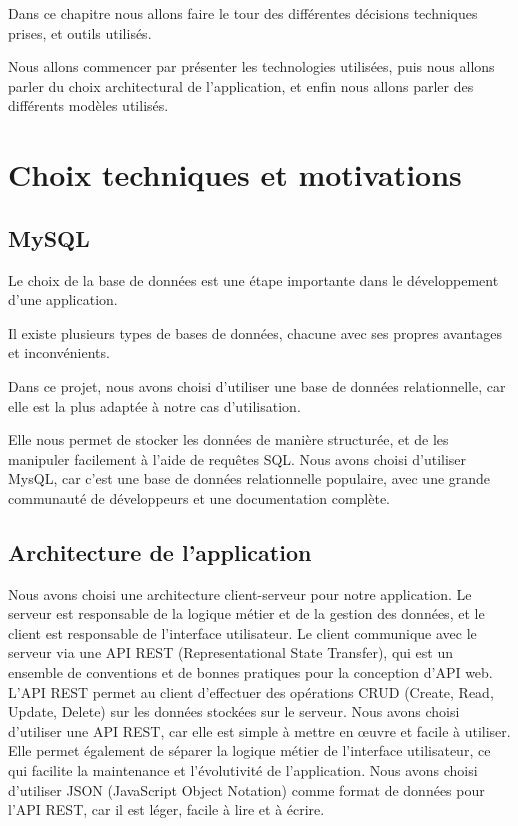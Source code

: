 Dans ce chapitre nous allons faire le tour des différentes décisions techniques
prises, et outils utilisés.

Nous allons commencer par présenter les technologies utilisées, puis nous allons parler du choix
architectural de l'application, et enfin nous allons parler des différents modèles utilisés.

\section{Choix techniques et motivations}\label{sec: conception-choix-techniques-et-motivation}
\subsection{MySQL}\label{subsec:conception-mysql}
Le choix de la base de données est une étape importante dans le développement
d'une application.

Il existe plusieurs types de bases de données, chacune avec
ses propres avantages et inconvénients.

Dans ce projet, nous avons choisi
d'utiliser une base de données relationnelle, car elle est la plus adaptée à
notre cas d'utilisation.

Elle nous permet de stocker les données de manière
structurée, et de les manipuler facilement à l'aide de requêtes SQL. Nous avons
choisi d'utiliser MysQL, car c'est une base de données relationnelle
populaire, avec une grande communauté de développeurs
et une documentation complète.


\subsection{Architecture de l'application}\label{subsec: conception-application-architecture}
Nous avons choisi une architecture client-serveur pour notre application. Le
serveur est responsable de la logique métier et de la gestion des données, et
le client est responsable de l'interface utilisateur. Le client communique avec
le serveur via une API REST (Representational State Transfer), qui est un
ensemble de conventions et de bonnes pratiques pour la conception d'API web.
L'API REST permet au client d'effectuer des opérations CRUD (Create, Read,
Update, Delete) sur les données stockées sur le serveur. Nous avons choisi
d'utiliser une API REST, car elle est simple à mettre en œuvre et facile à
utiliser. Elle permet également de séparer la logique métier de l'interface
utilisateur, ce qui facilite la maintenance et l'évolutivité de l'application.
Nous avons choisi d'utiliser JSON (JavaScript Object Notation) comme format de
données pour l'API REST, car il est léger, facile à lire et à écrire.

